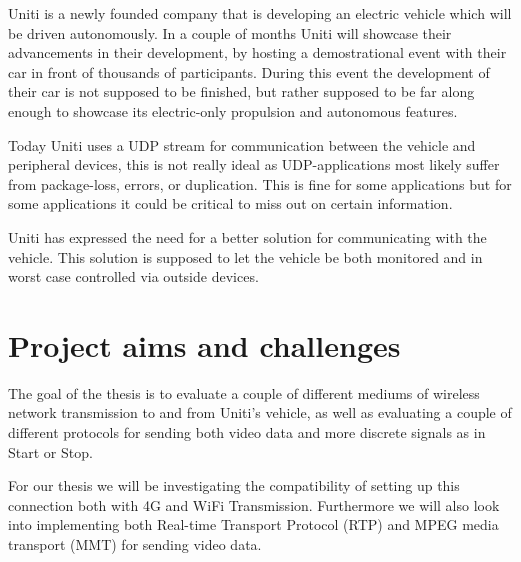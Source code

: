 \documentclass[a4paper]{article}
\begin{document}
Uniti is a newly founded company that is developing an electric vehicle which will be driven autonomously.
In a couple of months Uniti will showcase their advancements in their development,
by hosting a demostrational event with their car in front of thousands of participants.
During this event the development of their car is not supposed to be finished, 
but rather supposed to be far along enough to showcase its electric-only propulsion and autonomous features. 

Today Uniti uses a UDP stream for communication between the vehicle and
peripheral devices, this is not really ideal as UDP-applications most likely
suffer from package-loss, errors, or duplication. This is fine for some
applications but for some applications it could be critical to miss out on certain information.

Uniti has expressed the need for a better solution for communicating with the vehicle.
This solution is supposed to let the vehicle be both monitored and in worst case controlled via outside devices.


%
\section{Project aims and challenges}


The goal of the thesis is to evaluate a couple of different mediums of wireless
network transmission to and from Uniti's vehicle, as well as evaluating a couple
of different protocols for sending both video data and more discrete signals as
in Start or Stop.

For our thesis we will be investigating the compatibility of setting up this
connection both with 4G and WiFi Transmission. Furthermore we will also look
into implementing both Real-time Transport Protocol (RTP) and MPEG media
transport (MMT) for sending video data. 
\end{document}
